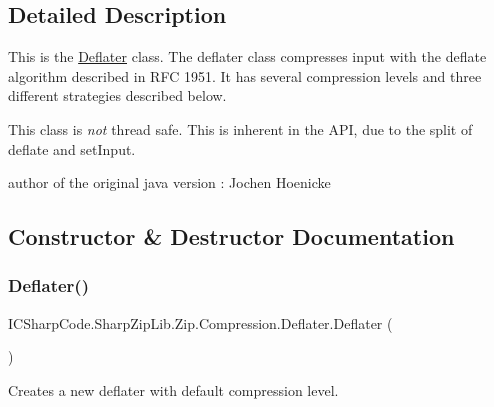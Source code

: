 \subsection{Detailed Description}
This is the \hyperlink{class_i_c_sharp_code_1_1_sharp_zip_lib_1_1_zip_1_1_compression_1_1_deflater}{Deflater} class. The deflater class compresses input with the deflate algorithm described in R\+FC 1951. It has several compression levels and three different strategies described below. 

This class is {\itshape not} thread safe. This is inherent in the A\+PI, due to the split of deflate and set\+Input.

author of the original java version \+: Jochen Hoenicke 

\subsection{Constructor \& Destructor Documentation}
\mbox{\label{class_i_c_sharp_code_1_1_sharp_zip_lib_1_1_zip_1_1_compression_1_1_deflater_aef92661d02455221261ea607e29710f2}} 
\subsubsection{\texorpdfstring{Deflater()}{Deflater()}\hspace{0.1cm}{\footnotesize\ttfamily [1/6]}}
{\footnotesize\ttfamily I\+C\+Sharp\+Code.\+Sharp\+Zip\+Lib.\+Zip.\+Compression.\+Deflater.\+Deflater (\begin{DoxyParamCaption}{ }\end{DoxyParamCaption})\hspace{0.3cm}{\ttfamily [inline]}}



Creates a new deflater with default compression level. 

\mbox{\label{class_i_c_sharp_code_1_1_sharp_zip_lib_1_1_zip_1_1_compression_1_1_deflater_a038451ce25b9917398218c5c741e9fb2}} 
